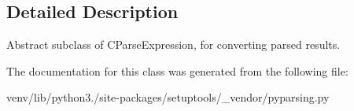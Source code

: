 \subsection{Detailed Description}
\begin{DoxyVerb}Abstract subclass of C{ParseExpression}, for converting parsed results.
\end{DoxyVerb}
 

The documentation for this class was generated from the following file\+:\begin{DoxyCompactItemize}
\item 
venv/lib/python3./site-\/packages/setuptools/\+\_\+vendor/pyparsing.\+py\end{DoxyCompactItemize}
